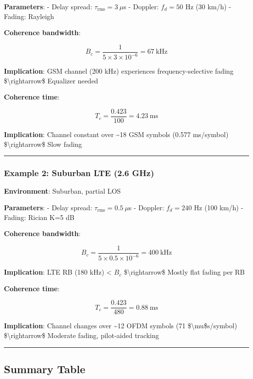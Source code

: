 \textbf{Parameters}: - Delay spread: \(\tau_{\text{rms}} = 3\ \mu\)s -
Doppler: \(f_d = 50\) Hz (30 km/h) - Fading: Rayleigh

\textbf{Coherence bandwidth}:

\[
B_c = \frac{1}{5 \times 3 \times 10^{-6}} = 67\ \text{kHz}
\]

\textbf{Implication}: GSM channel (200 kHz) experiences
frequency-selective fading \$\textbackslash rightarrow\$ Equalizer
needed

\textbf{Coherence time}:

\[
T_c = \frac{0.423}{100} = 4.23\ \text{ms}
\]

\textbf{Implication}: Channel constant over \textasciitilde18 GSM
symbols (0.577 ms/symbol) \$\textbackslash rightarrow\$ Slow fading

\begin{center}\rule{0.5\linewidth}{0.5pt}\end{center}

\subsubsection{Example 2: Suburban LTE (2.6
GHz)}\label{example-2-suburban-lte-2.6-ghz}

\textbf{Environment}: Suburban, partial LOS

\textbf{Parameters}: - Delay spread: \(\tau_{\text{rms}} = 0.5\ \mu\)s -
Doppler: \(f_d = 240\) Hz (100 km/h) - Fading: Rician K=5 dB

\textbf{Coherence bandwidth}:

\[
B_c = \frac{1}{5 \times 0.5 \times 10^{-6}} = 400\ \text{kHz}
\]

\textbf{Implication}: LTE RB (180 kHz) \textless{} \(B_c\)
\$\textbackslash rightarrow\$ Mostly flat fading per RB

\textbf{Coherence time}:

\[
T_c = \frac{0.423}{480} = 0.88\ \text{ms}
\]

\textbf{Implication}: Channel changes over \textasciitilde12 OFDM
symbols (71 \$\textbackslash mu\$s/symbol) \$\textbackslash rightarrow\$
Moderate fading, pilot-aided tracking

\begin{center}\rule{0.5\linewidth}{0.5pt}\end{center}

\subsection{Summary Table}\label{summary-table}

